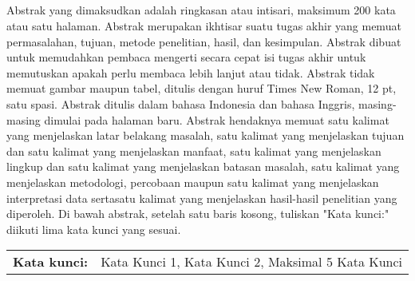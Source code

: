 
\begin{center}
\textbf{\fontsize{12pt}{0}\selectfont{Judul Skripsi Anda}} \\
\vspace{14pt}
\textbf{\fontsize{12pt}{0}\selectfont{Nama Mahasiswa (1xx45xxxx)}}\\
\textbf{\fontsize{12pt}{0}\selectfont{Nama Pembimbing 1 beserta gelar}}\\
\textbf{\fontsize{12pt}{0}\selectfont{Nama Pembimbing 2 beserta gelar}}\\
\vspace{36pt}
\textbf{\fontsize{12pt}{0}\selectfont{ABSTRAK}}
\end{center}
\vspace{20pt}
\singlespacing
Abstrak yang dimaksudkan adalah ringkasan atau intisari, maksimum 200 kata atau satu halaman. Abstrak merupakan ikhtisar suatu tugas akhir yang memuat permasalahan, tujuan, metode penelitian, hasil, dan kesimpulan. Abstrak dibuat untuk memudahkan pembaca mengerti secara cepat isi tugas akhir untuk memutuskan apakah perlu membaca lebih lanjut atau tidak. Abstrak tidak memuat gambar maupun tabel, ditulis dengan huruf Times New Roman, 12 pt, satu spasi. Abstrak ditulis dalam bahasa Indonesia dan bahasa Inggris, masing-masing dimulai pada halaman baru. Abstrak hendaknya memuat satu kalimat yang menjelaskan latar belakang masalah, satu kalimat yang menjelaskan tujuan dan satu kalimat yang menjelaskan manfaat, satu kalimat yang menjelaskan lingkup dan satu kalimat yang menjelaskan batasan masalah, satu kalimat yang menjelaskan metodologi, percobaan maupun satu kalimat yang menjelaskan interpretasi data sertasatu kalimat yang menjelaskan hasil-hasil penelitian yang diperoleh. Di bawah abstrak, setelah satu baris kosong, tuliskan "Kata kunci:" diikuti lima kata kunci yang sesuai.


\singlespacing
\noindent 
\vspace{1ex}
\noindent
\begin{tabularx}{\textwidth}{@{}lX@{}}
    {\textbf{Kata kunci:}} & {Kata Kunci 1, Kata Kunci 2, Maksimal 5 Kata Kunci}
\end{tabularx}
